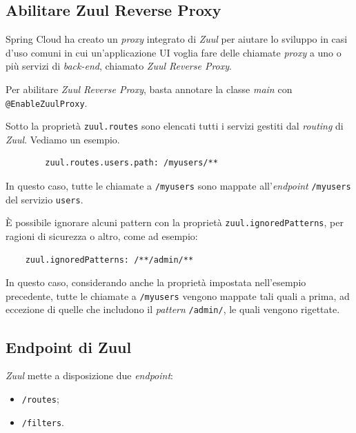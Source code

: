 \subsection{Abilitare Zuul Reverse Proxy} Spring Cloud ha creato un \textit{proxy} integrato di \textit{Zuul} per aiutare lo sviluppo in casi d'uso comuni in cui un'applicazione UI voglia fare delle chiamate \textit{proxy} a uno o più servizi di \textit{back-end}, chiamato \textit{Zuul Reverse Proxy}.

Per abilitare \textit{Zuul Reverse Proxy}, basta annotare la classe \textit{main} con \texttt{@EnableZuulProxy}.

Sotto la proprietà \texttt{zuul.routes} sono elencati tutti i servizi gestiti dal \textit{routing} di \textit{Zuul}.
Vediamo un esempio.

\begin{tcolorbox}
	\begin{verbatim}
		zuul.routes.users.path: /myusers/**
	\end{verbatim}
\end{tcolorbox}

In questo caso, tutte le chiamate a \texttt{/myusers} sono mappate all'\textit{endpoint} \texttt{/myusers} del servizio \texttt{users}.

È possibile ignorare alcuni pattern con la proprietà \texttt{zuul.ignoredPatterns}, per ragioni di sicurezza o altro, come ad esempio:

\begin{tcolorbox}
	\begin{verbatim}
	zuul.ignoredPatterns: /**/admin/**
	\end{verbatim}
\end{tcolorbox}

In questo caso, considerando anche la proprietà impostata nell'esempio precedente, tutte le chiamate a \texttt{/myusers} vengono mappate tali quali a prima, ad eccezione di quelle che includono il \textit{pattern} \texttt{/admin/}, le quali vengono rigettate.

\subsection{Endpoint di Zuul} \textit{Zuul} mette a disposizione due \textit{endpoint}:
\begin{itemize}
	\item \texttt{/routes};
	\item \texttt{/filters}.
\end{itemize}

